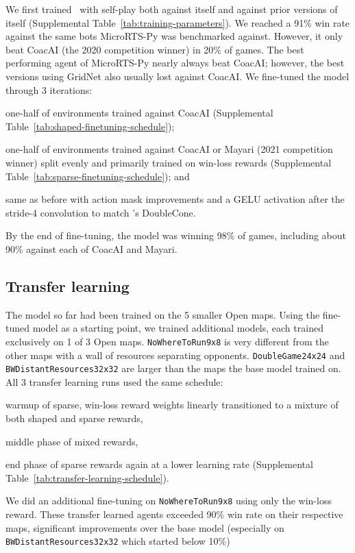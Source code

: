 \documentclass[conference]{IEEEtran}
\begin{document}
We first trained \agentName\ with self-play both against itself and against prior
versions of itself (Supplemental Table~\ref{tab:training-parameters}). We reached a 91\% win rate against the same bots MicroRTS-Py was
benchmarked against. However, it only beat CoacAI (the 2020 competition winner) in 20\%
of games. The best performing agent of MicroRTS-Py nearly always beat CoacAI; however,
the best versions using GridNet also usually lost against CoacAI. We fine-tuned
the model through 3 iterations:
\begin{inparaenum}[(1)]
    \item one-half of environments trained against CoacAI (Supplemental Table~\ref{tab:shaped-finetuning-schedule});
    \item one-half of environments trained against CoacAI or Mayari (2021 competition
    winner) split evenly and primarily trained on win-loss rewards (Supplemental Table~\ref{tab:sparse-finetuning-schedule}); and
    \item same as before with action mask improvements and a GELU activation
    after the stride-4 convolution to match \cite{Ferdinand2021doublecone}'s DoubleCone.
\end{inparaenum}
By the end of fine-tuning, the model was winning 98\% of games, including about 90\%
against each of CoacAI and Mayari.

\subsection{Transfer learning}
The model so far had been trained on the 5 smaller Open maps. Using the
fine-tuned model as a starting point, we trained additional models, each trained exclusively
on 1 of 3 Open maps. \texttt{NoWhereToRun9x8} is very different from the other maps with a wall of
resources separating opponents. \texttt{DoubleGame24x24} and
\texttt{BWDistantResources32x32} are larger than the maps the base model trained on.
All 3 transfer learning runs used the same schedule:
\begin{inparaenum}[(1)]
    \item warmup of sparse, win-loss reward weights linearly transitioned to a mixture
    of both shaped and sparse rewards,
    \item middle phase of mixed rewards,
    \item end phase of sparse rewards again at a lower learning rate (Supplemental Table~\ref{tab:transfer-learning-schedule}).
\end{inparaenum}
We did an additional fine-tuning on \texttt{NoWhereToRun9x8} using only the win-loss reward.
These transfer learned agents exceeded 90\% win rate on their respective maps,
significant improvements over the base model (especially on
\texttt{BWDistantResources32x32} which started below 10\%)
\end{document}
